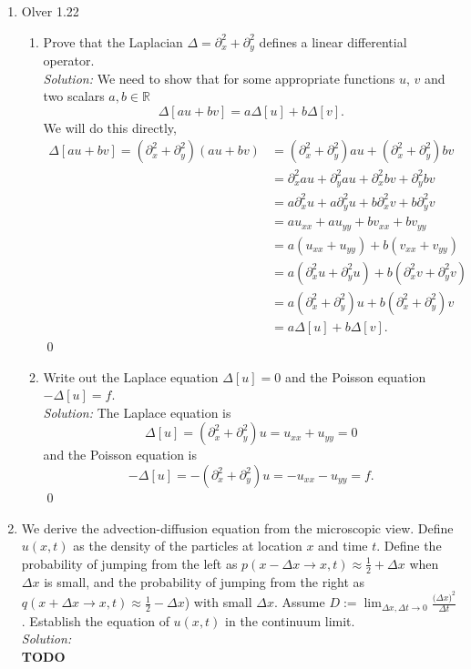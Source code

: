 \documentclass[10pt]{amsart}
\theoremstyle{nonumberplain}
\begin{document}
\begin{enumerate}[label={\bf {\arabic*}:}]
\item Olver 1.22 \\
\begin{enumerate}
\item Prove that the Laplacian $\Delta = \partial_x^2 + \partial_y^2$ defines a linear differential operator. \\

\textit{Solution:} We need to show that for some appropriate functions $u$, $v$ and two scalars $a, b \in \mathbb R$
$$
\Delta [au + bv] = a\Delta [u] + b \Delta [v].
$$
We will do this directly,
\begin{align*}
\Delta [au + bv] = (\partial_x^2 + \partial_y^2)(au + bv) &= (\partial_x^2 + \partial_y^2)au + (\partial_x^2 + \partial_y^2)bv \\
	&= \partial_x^2au + \partial_y^2au + \partial_x^2bv + \partial_y^2bv \\
	&= a \partial_x^2 u + a \partial_y^2 u + b \partial_x^2 v + b \partial_y^2 v \\
	&= a u_{xx} + a u_{yy} + b v_{xx} + b v_{yy} \\
	&= a (u_{xx} + u_{yy}) + b (v_{xx} + v_{yy}) \\
	&= a (\partial_x^2 u + \partial_y^2 u) + b (\partial_x^2 v + \partial_y^2 v) \\
	&= a (\partial_x^2 + \partial_y^2) u + b (\partial_x^2 + \partial_y^2) v \\
	&= a \Delta [u] + b \Delta [v].
\end{align*}
\qed \\

\item Write out the Laplace equation $\Delta[u] = 0$ and the Poisson equation $-\Delta[u] = f$. \\

\textit{Solution:} The Laplace equation is
$$
\Delta [u] = (\partial_x^2 + \partial_y^2)u = u_{xx} + u_{yy} = 0
$$
and the Poisson equation is 
$$
- \Delta [u] = - (\partial_x^2 + \partial_y^2)u = - u_{xx} - u_{yy} = f.
$$
\qed \\

\end{enumerate}
\newpage

\item We derive the advection-diffusion equation from the microscopic view.
Define $u(x, t)$ as the density of the particles at location $x$ and time $t$.
Define the probability of jumping from the left as $p(x - \Delta x \rightarrow x, t) \approx \frac 1 2 + \Delta x$
when $\Delta x$ is small, and the probability of jumping from the right as $q(x + \Delta x \rightarrow x, t) \approx \frac 1 2 - \Delta x $) with small $\Delta x$.
Assume $D := \lim_{\Delta x, \Delta t \rightarrow 0} \frac {\big(\Delta x\big)^2}{\Delta t}$.
Establish the equation of $u(x, t)$ in the continuum limit. \\
\textit{Solution:} \\
\textbf{TODO} \\


\end{enumerate}
\end{document}
